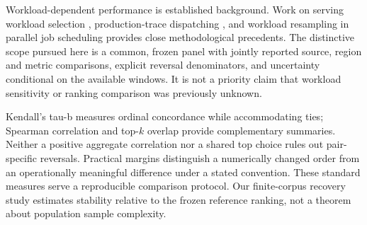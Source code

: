 \label{sec:related-dependence}
Workload-dependent performance is established background. Work on serving
workload selection \citep{papaioannou2024workload}, production-trace
dispatching \citep{yildiz2026dispatching}, and workload resampling in parallel
job scheduling \citep{zakay2014resampling} provides close methodological
precedents. The distinctive scope pursued here is a common, frozen panel
with jointly reported source, region and metric comparisons, explicit
reversal denominators, and uncertainty conditional on the available windows.
It is not a priority claim that workload sensitivity or ranking comparison
was previously unknown.

\label{sec:related-methodology}\label{sec:related-position}
Kendall's tau-b measures ordinal concordance while accommodating ties;
Spearman correlation and top-$k$ overlap provide complementary summaries.
Neither a positive aggregate correlation nor a shared top choice rules out
pair-specific reversals. Practical margins distinguish a numerically changed
order from an operationally meaningful difference under a stated convention.
These standard measures serve a reproducible comparison protocol. Our
finite-corpus recovery study estimates stability relative to the frozen
reference ranking, not a theorem about population sample complexity.
